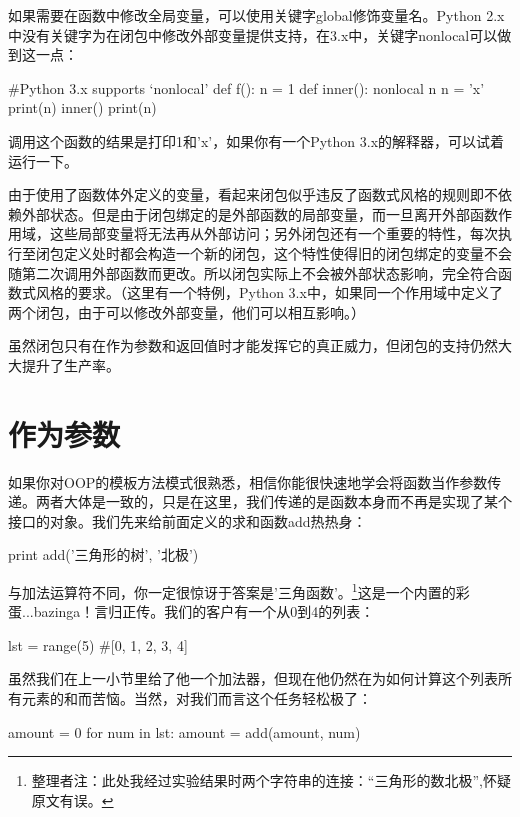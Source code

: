\documentclass[12pt,a4paper]{report}
\begin{document}
如果需要在函数中修改全局变量，可以使用关键字global修饰变量名。Python 2.x中没有关键字为在闭包中修改外部变量提供支持，在3.x中，关键字nonlocal可以做到这一点： 
\begin{python}[moreemph={[4]42},caption={},label=ex1]
#Python 3.x supports `nonlocal'
def f():
    n = 1
    def inner():
    nonlocal n
    n = 'x'
print(n)
inner()
print(n)
\end{python}

调用这个函数的结果是打印1和'x'，如果你有一个Python 3.x的解释器，可以试着运行一下。

由于使用了函数体外定义的变量，看起来闭包似乎违反了函数式风格的规则即不依赖外部状态。但是由于闭包绑定的是外部函数的局部变量，而一旦离开外部函数作用域，这些局部变量将无法再从外部访问；另外闭包还有一个重要的特性，每次执行至闭包定义处时都会构造一个新的闭包，这个特性使得旧的闭包绑定的变量不会随第二次调用外部函数而更改。所以闭包实际上不会被外部状态影响，完全符合函数式风格的要求。（这里有一个特例，Python 3.x中，如果同一个作用域中定义了两个闭包，由于可以修改外部变量，他们可以相互影响。）

虽然闭包只有在作为参数和返回值时才能发挥它的真正威力，但闭包的支持仍然大大提升了生产率。
\section{作为参数}
如果你对OOP的模板方法模式很熟悉，相信你能很快速地学会将函数当作参数传递。两者大体是一致的，只是在这里，我们传递的是函数本身而不再是实现了某个接口的对象。我们先来给前面定义的求和函数add热热身： 
\begin{python}[moreemph={[4]42},caption={},label=ex1]
print add('三角形的树', '北极')
\end{python}

与加法运算符不同，你一定很惊讶于答案是'三角函数'。\footnote{整理者注：此处我经过实验结果时两个字符串的连接：“三角形的数北极”,怀疑原文有误。}这是一个内置的彩蛋...bazinga！言归正传。我们的客户有一个从0到4的列表： 
\begin{python}[moreemph={[4]42},caption={},label=ex1]
lst = range(5) #[0, 1, 2, 3, 4]
\end{python}

虽然我们在上一小节里给了他一个加法器，但现在他仍然在为如何计算这个列表所有元素的和而苦恼。当然，对我们而言这个任务轻松极了：
\begin{python}[moreemph={[4]42},caption={},label=ex1]
amount = 0
for num in lst:
    amount = add(amount, num)
\end{python}
\end{document}

